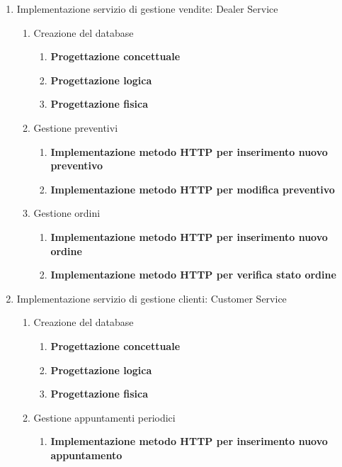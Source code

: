 \documentclass{article}
\begin{document}
\begin{enumerate}
\begin{enumerate}
        \end{enumerate}
        \item Implementazione servizio di gestione vendite: Dealer Service
        \begin{enumerate}
            \item Creazione del database
            \begin{enumerate}
                \item \textbf{Progettazione concettuale}
                \item \textbf{Progettazione logica}
                \item \textbf{Progettazione fisica}
            \end{enumerate}
            \item Gestione preventivi
            \begin{enumerate}
                \item \textbf{Implementazione metodo HTTP per inserimento nuovo preventivo}
                \item \textbf{Implementazione metodo HTTP per modifica preventivo}
            \end{enumerate}
            \item Gestione ordini
            \begin{enumerate}
                \item \textbf{Implementazione metodo HTTP per inserimento nuovo ordine}
                \item \textbf{Implementazione metodo HTTP per verifica stato ordine}
            \end{enumerate}
        \end{enumerate}
        \item Implementazione servizio di gestione clienti: Customer Service
        \begin{enumerate}
            \item Creazione del database
            \begin{enumerate}
                \item \textbf{Progettazione concettuale}
                \item \textbf{Progettazione logica}
                \item \textbf{Progettazione fisica}
            \end{enumerate}
            \item Gestione appuntamenti periodici
            \begin{enumerate}
                \item \textbf{Implementazione metodo HTTP per inserimento nuovo appuntamento}

\end{enumerate}
\end{enumerate}
\end{enumerate}
\end{document}
